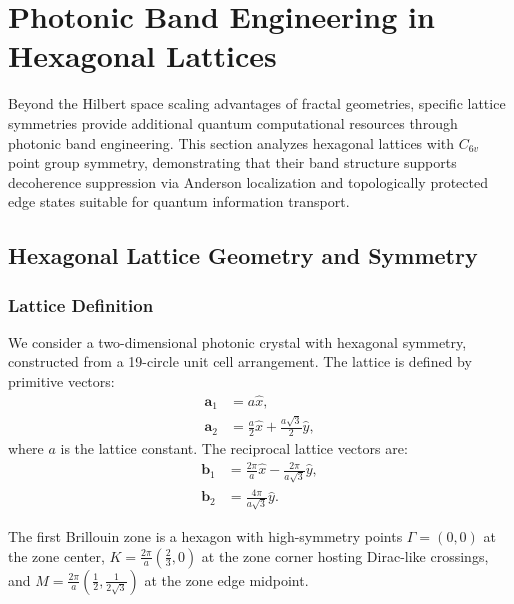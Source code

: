 
\section{Photonic Band Engineering in Hexagonal Lattices}
\label{sec:photonics}

Beyond the Hilbert space scaling advantages of fractal geometries, specific lattice symmetries provide additional quantum computational resources through photonic band engineering. This section analyzes hexagonal lattices with $C_{6v}$ point group symmetry, demonstrating that their band structure supports decoherence suppression via Anderson localization and topologically protected edge states suitable for quantum information transport.

\subsection{Hexagonal Lattice Geometry and Symmetry}

\subsubsection{Lattice Definition}

We consider a two-dimensional photonic crystal with hexagonal symmetry, constructed from a 19-circle unit cell arrangement. The lattice is defined by primitive vectors:
\begin{align}
\mathbf{a}_1 &= a \hat{x}, \\
\mathbf{a}_2 &= \frac{a}{2} \hat{x} + \frac{a\sqrt{3}}{2} \hat{y},
\end{align}
where $a$ is the lattice constant. The reciprocal lattice vectors are:
\begin{align}
\mathbf{b}_1 &= \frac{2\pi}{a} \hat{x} - \frac{2\pi}{a\sqrt{3}} \hat{y}, \\
\mathbf{b}_2 &= \frac{4\pi}{a\sqrt{3}} \hat{y}.
\end{align}

The first Brillouin zone is a hexagon with high-symmetry points $\Gamma = (0, 0)$ at the zone center, $K = \frac{2\pi}{a}\left(\frac{2}{3}, 0\right)$ at the zone corner hosting Dirac-like crossings, and $M = \frac{2\pi}{a}\left(\frac{1}{2}, \frac{1}{2\sqrt{3}}\right)$ at the zone edge midpoint.

